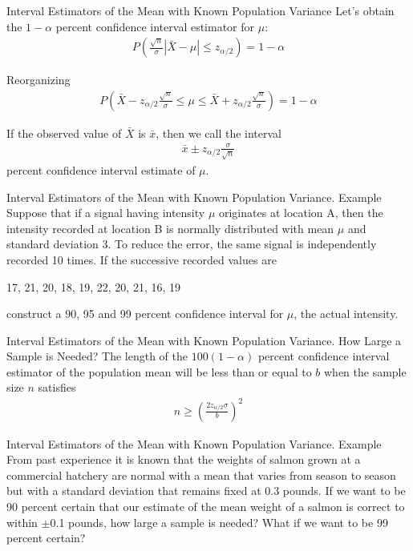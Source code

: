 \documentclass{beamer}
\newcommand{\abs}[1]{\left|#1\right|}
\renewcommand{\P}[1]{P\left(#1\right)}
\begin{document}
\begin{frame}{Interval Estimators of the Mean with Known
    Population Variance}
  Let's obtain the $1-\alpha$ percent confidence interval estimator for $\mu$:
  \begin{align*}
    \P{\frac{\sqrt{n}}{\sigma}\abs{\bar{X}-\mu} \leq z_{\alpha/2}} = 1-\alpha
  \end{align*}

  Reorganizing
  \begin{align*}
    \P{\bar{X} - z_{\alpha/2}\frac{\sqrt{n}}{\sigma}
    \leq \mu \leq \bar{X} + z_{\alpha/2}\frac{\sqrt{n}}{\sigma}} = 1 - \alpha
  \end{align*}

  If the observed value of $\bar{X}$ is $\bar{x}$, then we call the interval
  \begin{align*}
    \bar{x}\pm z_{\alpha/2}\frac{\sigma}{\sqrt{n}}
  \end{align*}
  percent confidence interval estimate of $\mu$.
\end{frame}

\begin{frame}[t,shrink=10]{Interval Estimators of the Mean with Known
    Population Variance. Example}
  Suppose that if a signal having intensity $\mu$ originates at location A, then
  the intensity recorded at location B is normally distributed with mean $\mu$
  and standard deviation 3. To reduce the error, the same signal is
  independently recorded 10 times. If the successive recorded values are
  \begin{center}
    17, 21, 20, 18, 19, 22, 20, 21, 16, 19
  \end{center}
  construct a 90, 95 and 99 percent confidence interval for $\mu$, the actual
  intensity.
\end{frame}

\begin{frame}{Interval Estimators of the Mean with Known Population
    Variance. How Large a Sample is Needed?}
  The length of the $100(1 - \alpha)$ percent confidence interval estimator of
  the population mean will be less than or equal to $b$ when the sample size $n$
  satisfies
  \begin{align*}
    n \geq \left( \frac{2z_{\alpha/2}\sigma}{b}  \right)^2
  \end{align*}
\end{frame}

\begin{frame}[t,shrink=10]{Interval Estimators of the Mean with Known
    Population Variance. Example}
  From past experience it is known that the weights of salmon grown at a
  commercial hatchery are normal with a mean that varies from season to season
  but with a standard deviation that remains fixed at 0.3 pounds. If we want to
  be 90 percent certain that our estimate of the mean weight of a salmon is
  correct to within $\pm$0.1 pounds, how large a sample is needed? What if we
  want to be 99 percent certain?
\end{frame}
\end{document}
